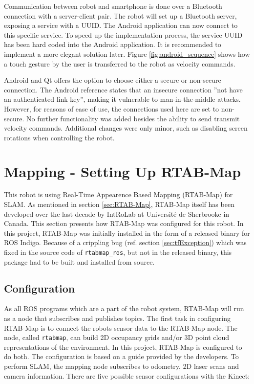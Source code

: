 Communication between robot and smartphone is done over a Bluetooth connection with a server-client pair. The robot will set up a Bluetooth server, exposing a service with a \ac{UUID}. The Android application can now connect to this specific service. To speed up the implementation process, the service \ac{UUID} has been hard coded into the Android application. It is recommended to implement a more elegant solution later. Figure \ref{fig:android_sequence} shows how a touch gesture by the user is transferred to the robot as velocity commands. 

Android and Qt offers the option to choose either a secure or non-secure connection. The Android reference states that an insecure connection ''not have an authenticated link key''\cite{android_bt_reference}, making it vulnerable to man-in-the-middle attacks. However, for reasons of ease of use, the connections used here are set to non-secure. No further functionality was added besides the ability to send transmit velocity commands. Additional changes were only minor, such as disabling screen rotations when controlling the robot. 






\section{Mapping - Setting Up RTAB-Map}
\label{sec:mapping}
This robot is using Real-Time Appearence Based Mapping (\ac{RTAB-Map}) for \ac{SLAM}. As mentioned in section \ref{sec:RTAB-Map}, \ac{RTAB-Map} itself has been developed over the last decade by IntRoLab at Université de Sherbrooke in Canada. This section presents how \ac{RTAB-Map} was configured for this robot. In this project, \ac{RTAB-Map} was initially installed in the form of a released binary for \ac{ROS} Indigo. Because of a crippling bug (ref. section \ref{sec:tfException}) which was fixed in the source code
of \texttt{rtabmap\_ros}, but not in the released binary, this package had to be built and installed from source.

\subsection{Configuration}
\label{sec:configuration}
As all \ac{ROS} programs which are a part of the robot system, \ac{RTAB-Map} will run as a node that subscribes and publishes topics. The first task in configuring \ac{RTAB-Map} is to connect the robots sensor data to the \ac{RTAB-Map} node. The node, called \texttt{rtabmap}, can build 2D occupancy grids and/or 3D point cloud representations of the environment. In this project, \ac{RTAB-Map} is configured to do both. The configuration is based on a guide\cite{rtabmap_setup} provided by the developers. To perform \ac{SLAM}, the mapping node subscribes to odometry, 2D laser scans and camera information. There are five possible sensor configurations with the Kinect\cite{rtabmap_setup}:

